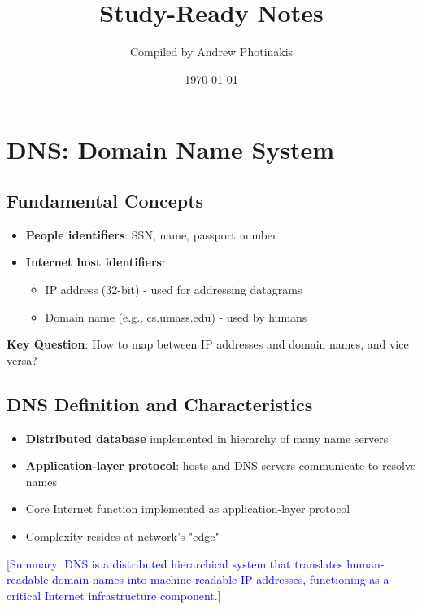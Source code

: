 \documentclass[12pt]{article}
\title{\TOPICTITLE\\\large Study-Ready Notes}
\author{Compiled by Andrew Photinakis}
\date{\today}
\begin{document}
\maketitle
\tableofcontents
\newpage


\section{DNS: Domain Name System}
\subsection{Fundamental Concepts}

\begin{itemize}
    \item \textbf{People identifiers}: SSN, name, passport number
    \item \textbf{Internet host identifiers}:
          \begin{itemize}
              \item IP address (32-bit) - used for addressing datagrams
              \item Domain name (e.g., cs.umass.edu) - used by humans
          \end{itemize}
\end{itemize}

\textbf{Key Question}: How to map between IP addresses and domain names, and vice versa?

\subsection{DNS Definition and Characteristics}
\begin{itemize}
    \item \textbf{Distributed database} implemented in hierarchy of many name servers
    \item \textbf{Application-layer protocol}: hosts and DNS servers communicate to resolve names
    \item Core Internet function implemented as application-layer protocol
    \item Complexity resides at network's "edge"
\end{itemize}

\textcolor{blue}{[Summary: DNS is a distributed hierarchical system that translates human-readable domain names into machine-readable IP addresses, functioning as a critical Internet infrastructure component.]}
\end{document}
